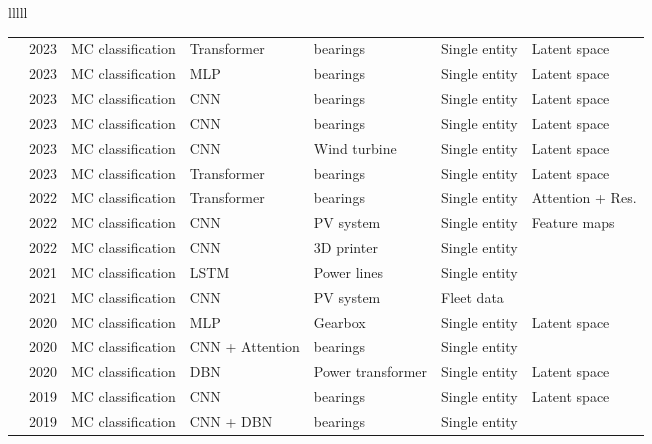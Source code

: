 \begin{landscape}
\begin{longtable}{lllll}
\begin{tabular}{lllllll}
\cite{cheMultiscaleTimeFrequencySparse2023} & 2023 & MC classification & Transformer & bearings & Single entity & Latent space \\
\cite{chengIntelligentFaultDiagnosis2023} & 2023 & MC classification & MLP & bearings & Single entity & Latent space \\
\cite{dengFaultDiagnosisMethod2023} & 2023 & MC classification & CNN & bearings & Single entity & Latent space \\
\cite{liCrossdomainAugmentationDiagnosis2023} & 2023 & MC classification & CNN & bearings & Single entity & Latent space \\
\cite{zhangFaultDiagnosisBidirectional2023} & 2023 & MC classification & CNN & Wind turbine & Single entity & Latent space \\
\cite{zhangTSViTTimeSeries2023} & 2023 & MC classification & Transformer & bearings & Single entity & Latent space \\
\cite{chiBearingFaultDiagnosis2022} & 2022 & MC classification & Transformer & bearings & Single entity & Attention + Res. \\
\cite{haidariDeepLearningbasedModel2022} & 2022 & MC classification & CNN & PV system & Single entity & Feature maps \\
\cite{yangIncrementalNoveltyIdentification2022} & 2022 & MC classification & CNN & 3D printer & Single entity & \texttimes \\
\cite{belagouneDeepLearningLSTM2021} & 2021 & MC classification & LSTM & Power lines & Single entity & \texttimes \\
\cite{zakiDeeplearningbasedMethodFaults2021} & 2021 & MC classification & CNN & PV system & Fleet data & \texttimes \\
\cite{arellano-espitiaDeepLearningBasedMethodologyFault2020} & 2020 & MC classification & MLP & Gearbox & Single entity & Latent space \\
\cite{wangIntelligentBearingFault2020} & 2020 & MC classification & CNN + Attention & bearings & Single entity & \texttimes \\
\cite{zhangTransformerFaultDiagnosis2020} & 2020 & MC classification & DBN & Power transformer & Single entity & Latent space \\
\cite{hanEnhancedConvolutionalNeural2019} & 2019 & MC classification & CNN & bearings & Single entity & Latent space \\
\cite{maEnsembleDeepLearningbased2019} & 2019 & MC classification & CNN + DBN & bearings & Single entity & \texttimes \\

\end{tabular}
\end{longtable}
\end{landscape}
